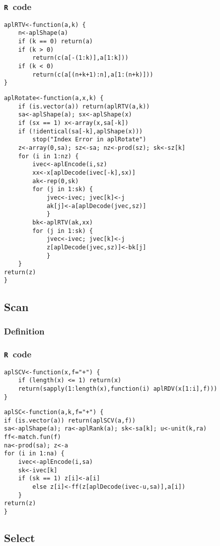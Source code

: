 \documentclass[11pt]{amsart}
\theoremstyle{plain}
\theoremstyle{definition}
\theoremstyle{remark}
\newcommand{\tR}{\texttt{R}}
\begin{document}
\subsubsection{\tR\ code}\quad
\begin{lstlisting}
aplRTV<-function(a,k) {
    n<-aplShape(a)
    if (k == 0) return(a)
    if (k > 0)
        return(c(a[-(1:k)],a[1:k]))
    if (k < 0)
        return(c(a[(n+k+1):n],a[1:(n+k)]))
}
\end{lstlisting}
\begin{lstlisting}
aplRotate<-function(a,x,k) {
    if (is.vector(a)) return(aplRTV(a,k))
    sa<-aplShape(a); sx<-aplShape(x)
    if (sx == 1) x<-array(x,sa[-k])
    if (!identical(sa[-k],aplShape(x)))
        stop("Index Error in aplRotate")
    z<-array(0,sa); sz<-sa; nz<-prod(sz); sk<-sz[k]
    for (i in 1:nz) {
        ivec<-aplEncode(i,sz)
        xx<-x[aplDecode(ivec[-k],sx)]
        ak<-rep(0,sk)
        for (j in 1:sk) {
            jvec<-ivec; jvec[k]<-j
            ak[j]<-a[aplDecode(jvec,sz)]
            }
        bk<-aplRTV(ak,xx)
        for (j in 1:sk) {
            jvec<-ivec; jvec[k]<-j
            z[aplDecode(jvec,sz)]<-bk[j]
            }
    }
return(z)
}
\end{lstlisting}
\subsection{Scan}\quad
\subsubsection{Definition}
\subsubsection{\tR\ code}\quad
\begin{lstlisting}
aplSCV<-function(x,f="+") {
    if (length(x) <= 1) return(x)
    return(sapply(1:length(x),function(i) aplRDV(x[1:i],f)))
}
\end{lstlisting}
\begin{lstlisting}
aplSC<-function(a,k,f="+") {
if (is.vector(a)) return(aplSCV(a,f))
sa<-aplShape(a); ra<-aplRank(a); sk<-sa[k]; u<-unit(k,ra)
ff<-match.fun(f)
na<-prod(sa); z<-a
for (i in 1:na) {
    ivec<-aplEncode(i,sa)
    sk<-ivec[k]
    if (sk == 1) z[i]<-a[i]
        else z[i]<-ff(z[aplDecode(ivec-u,sa)],a[i])
    }
return(z)
}
\end{lstlisting}

\subsection{Select}\quad
\end{document}
